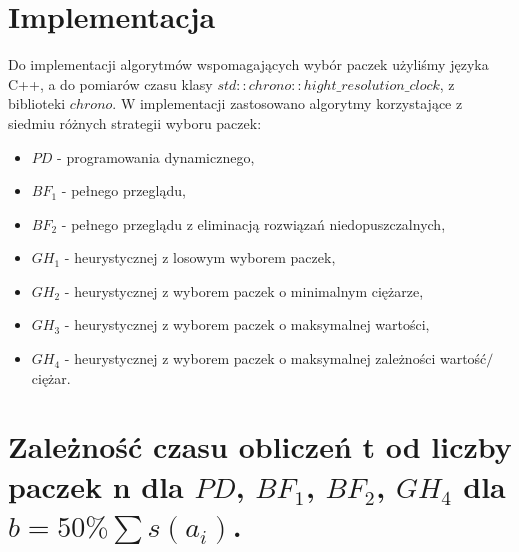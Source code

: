 \documentclass[polish,polish,a4paper]{article}
\begin{document}
\begin{spacing}{1.35}
	
	\section{Implementacja}
	
	Do implementacji algorytmów wspomagających wybór paczek użyliśmy języka C++, a do pomiarów czasu klasy $std::chrono::hight\_resolution\_clock$, z biblioteki $chrono$. W implementacji zastosowano algorytmy korzystające z  siedmiu różnych strategii wyboru paczek:
	\begin{itemize}
		\item $PD$ - programowania dynamicznego,
		\item $BF_{1}$ - pełnego przeglądu,
		\item $BF_{2}$ - pełnego przeglądu z eliminacją rozwiązań niedopuszczalnych,
		\item $GH_{1}$ - heurystycznej z losowym wyborem paczek,
		\item $GH_{2}$ - heurystycznej z wyborem paczek o minimalnym ciężarze,
		\item $GH_{3}$ - heurystycznej z wyborem paczek o maksymalnej wartości,
		\item $GH_{4}$ - heurystycznej z wyborem paczek o maksymalnej zależności wartość$/$ciężar.  
	\end{itemize}
	
	
	
	\section{Zależność czasu obliczeń t od liczby paczek n dla $PD$, $BF_{1}$, $BF_{2}$, $GH_{4}$ dla $b = 50 \% \sum s (a_{i})$. }
	
		\begin{figure}[H]
		\centering

\end{figure}
\end{spacing}
\end{document}
